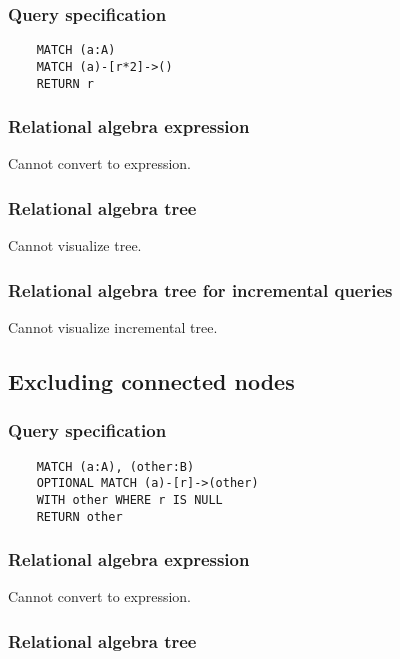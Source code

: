 	\subsubsection*{Query specification}

	\begin{lstlisting}
	MATCH (a:A)
	MATCH (a)-[r*2]->()
	RETURN r
	\end{lstlisting}


	\subsubsection*{Relational algebra expression}

	Cannot convert to expression.

	\subsubsection*{Relational algebra tree}

	Cannot visualize tree.

	\subsubsection*{Relational algebra tree for incremental queries}

	Cannot visualize incremental tree.
	\subsection{Excluding connected nodes}

	\subsubsection*{Query specification}

	\begin{lstlisting}
	MATCH (a:A), (other:B)
	OPTIONAL MATCH (a)-[r]->(other)
	WITH other WHERE r IS NULL
	RETURN other
	\end{lstlisting}


	\subsubsection*{Relational algebra expression}

	Cannot convert to expression.

	\subsubsection*{Relational algebra tree}

